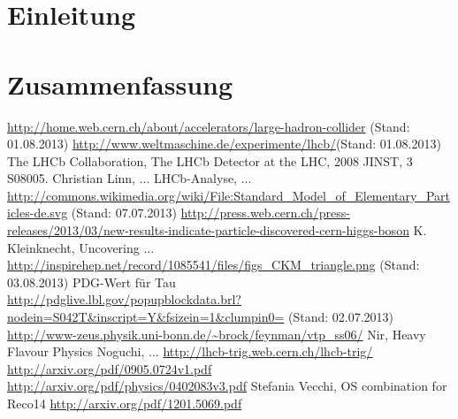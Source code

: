 \documentclass[a4paper]{scrbook}
\begin{document}

\tableofcontents

\chapter{Einleitung}







\chapter{Zusammenfassung}


\begin{thebibliography}{---}
 \url{http://home.web.cern.ch/about/accelerators/large-hadron-collider} (Stand: 01.08.2013)
 \url{http://www.weltmaschine.de/experimente/lhcb/}(Stand: 01.08.2013)
 The LHCb Collaboration, The LHCb Detector at the LHC, 2008 JINST, 3 S08005.
 Christian Linn, ...
 LHCb-Analyse, ...
 \url{http://commons.wikimedia.org/wiki/File:Standard_Model_of_Elementary_Particles-de.svg} (Stand: 07.07.2013)
 \url{http://press.web.cern.ch/press-releases/2013/03/new-results-indicate-particle-discovered-cern-higgs-boson}
  K. Kleinknecht, Uncovering ...
 \url{http://inspirehep.net/record/1085541/files/figs_CKM_triangle.png} (Stand: 03.08.2013)
 PDG-Wert für Tau \\ \url{http://pdglive.lbl.gov/popupblockdata.brl?nodein=S042T&inscript=Y&fsizein=1&clumpin0=} (Stand: 02.07.2013)
 \url{http://www-zeus.physik.uni-bonn.de/~brock/feynman/vtp_ss06/}
 Nir, Heavy Flavour Physics
 Noguchi, ...
 \url{http://lhcb-trig.web.cern.ch/lhcb-trig/}
 \url{http://arxiv.org/pdf/0905.0724v1.pdf}
 \url{http://arxiv.org/pdf/physics/0402083v3.pdf}
 Stefania Vecchi, OS combination for Reco14
 \url{http://arxiv.org/pdf/1201.5069.pdf}
\end{thebibliography}
\end{document}

